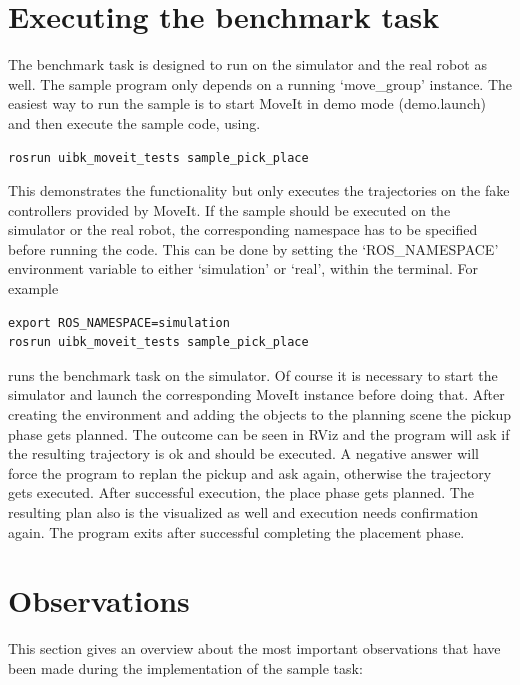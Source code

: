 \section{Executing the benchmark task}

The benchmark task is designed to run on the simulator and the real robot as well. The sample program only depends on a running `move\_group' instance. The easiest way to run the sample is to start MoveIt in demo mode (demo.launch) and then execute the sample code, using.

\begin{verbatim}
rosrun uibk_moveit_tests sample_pick_place 
\end{verbatim}

This demonstrates the functionality but only executes the trajectories on the fake controllers provided by MoveIt. If the sample should be executed on the simulator or the real robot, the corresponding namespace has to be specified before running the code. This can be done by setting the `ROS\_NAMESPACE' environment variable to either `simulation' or `real', within the terminal. For example

\begin{verbatim}
export ROS_NAMESPACE=simulation
rosrun uibk_moveit_tests sample_pick_place 
\end{verbatim}

runs the benchmark task on the simulator. Of course it is necessary to start the simulator and launch the corresponding MoveIt instance before doing that. After creating the environment and adding the objects to the planning scene the pickup phase gets planned. The outcome can be seen in RViz and the program will ask if the resulting trajectory is ok and should be executed. A negative answer will force the program to replan the pickup and ask again, otherwise the trajectory gets executed. After successful execution, the place phase gets planned. The resulting plan also is the visualized as well and execution needs confirmation again. The program exits after successful completing the placement phase.

\section{Observations}

This section gives an overview about the most important observations that have been made during the implementation of the sample task:

